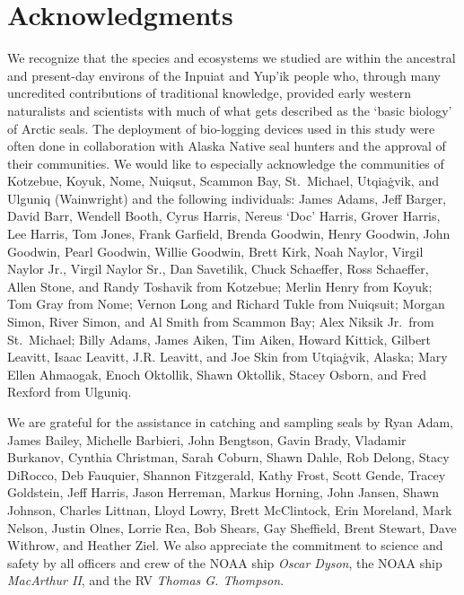 \documentclass[fleqn,10pt,lineno]{wlpeerj} %
\begin{document}
\hypertarget{acknowledgments}{%
\section*{Acknowledgments}\label{acknowledgments}}

We recognize that the species and ecosystems we studied are within the ancestral
and present-day environs of the Inpuiat and Yup'ik people who, through many
uncredited contributions of traditional knowledge, provided early western
naturalists and scientists with much of what gets described as the `basic
biology' of Arctic seals. The deployment of bio-logging devices used in this
study were often done in collaboration with Alaska Native seal hunters and the
approval of
their communities. We would like to especially acknowledge the communities of
Kotzebue, Koyuk, Nome, Nuiqsut, Scammon Bay, St.~Michael, Utqiaġvik, and Ulguniq
(Wainwright) and the following individuals: James Adams, Jeff Barger, David
Barr, Wendell Booth, Cyrus Harris, Nereus `Doc' Harris, Grover Harris, Lee
Harris, Tom Jones, Frank Garfield, Brenda Goodwin, Henry Goodwin, John Goodwin,
Pearl Goodwin, Willie Goodwin, Brett Kirk, Noah Naylor, Virgil Naylor Jr.,
Virgil Naylor Sr., Dan Savetilik, Chuck Schaeffer, Ross Schaeffer, Allen Stone,
and Randy Toshavik from Kotzebue; Merlin Henry from Koyuk; Tom
Gray from Nome; Vernon Long and Richard Tukle from Nuiqsuit; Morgan
Simon, River Simon, and Al Smith from Scammon Bay; Alex Niksik Jr.~from
St.~Michael; Billy Adams, James Aiken, Tim Aiken, Howard Kittick,
Gilbert Leavitt, Isaac Leavitt, J.R. Leavitt, and Joe Skin from Utqiaġvik,
Alaska; Mary Ellen Ahmaogak, Enoch Oktollik, Shawn Oktollik, Stacey Osborn, and
Fred Rexford from Ulguniq.

We are grateful for the assistance in catching and sampling seals by Ryan Adam,
James Bailey, Michelle Barbieri, John Bengtson, Gavin Brady, Vladamir Burkanov,
Cynthia Christman, Sarah Coburn, Shawn Dahle, Rob Delong, Stacy DiRocco, Deb
Fauquier, Shannon Fitzgerald, Kathy Frost, Scott Gende, Tracey Goldstein, Jeff
Harris, Jason Herreman, Markus Horning, John Jansen, Shawn Johnson, Charles
Littnan, Lloyd Lowry, Brett McClintock, Erin Moreland, Mark Nelson, Justin
Olnes, Lorrie Rea, Bob Shears, Gay Sheffield, Brent Stewart, Dave Withrow, and
Heather Ziel. We also appreciate the commitment to science and safety by all
officers and crew of the NOAA ship \emph{Oscar Dyson}, the NOAA ship \emph{MacArthur II}, and
the RV \emph{Thomas G. Thompson}.
\end{document}
